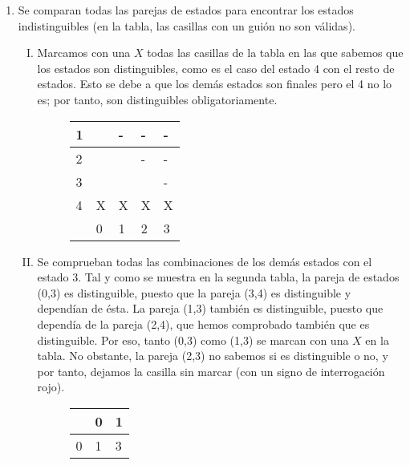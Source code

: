 \documentclass[11pt,a4paper]{article}
\begin{document}
\begin{enumerate}[a)]
\begin{enumerate}[1.]
\begin{figure}[H]
		\end{figure}
		\item Se comparan todas las parejas de estados para encontrar los estados indistinguibles (en la tabla, las casillas con un guión no son válidas).\\
		\begin{enumerate}[I.]
		\item Marcamos con una $X$ todas las casillas de la tabla en las que sabemos que los estados son distinguibles, como es el caso del estado 4 con el resto de estados. Esto se debe a que los demás estados son finales pero el 4 no lo es; por tanto, son distinguibles obligatoriamente.
		\begin{figure}[H]
		\centering
				\begin{tabular}{|l|l|l|l|l|}
				\hline
				1 &  & - & - & - \\ \hline
				2 &  &  & - & - \\ \hline
				3 &  &  &  & - \\ \hline
				4 & X & X & X & X \\ \hline
			  	  & 0 & 1 & 2 & 3 \\ \hline
				\end{tabular}
		\end{figure}
		\item Se comprueban todas las combinaciones de los demás estados con el estado 3. Tal y como se muestra en la segunda tabla, la pareja de estados (0,3) es distinguible, puesto que la pareja (3,4) es distinguible y dependían de ésta. La pareja (1,3) también es distinguible, puesto que dependía de la pareja (2,4), que hemos comprobado también que es distinguible. Por eso, tanto (0,3) como (1,3) se marcan con una $X$ en la tabla. No obstante, la pareja (2,3) no sabemos si es distinguible o no, y por tanto, dejamos la casilla sin marcar (con un signo de interrogación rojo).
		\begin{figure}[H]
		\centering
			\begin{tabular}{l|ll}
				  & 0 & 1 \\ \hline
				0 & 1 & 3 \\

\end{tabular}
\end{figure}
\end{enumerate}
\end{enumerate}
\end{enumerate}
\end{document}
